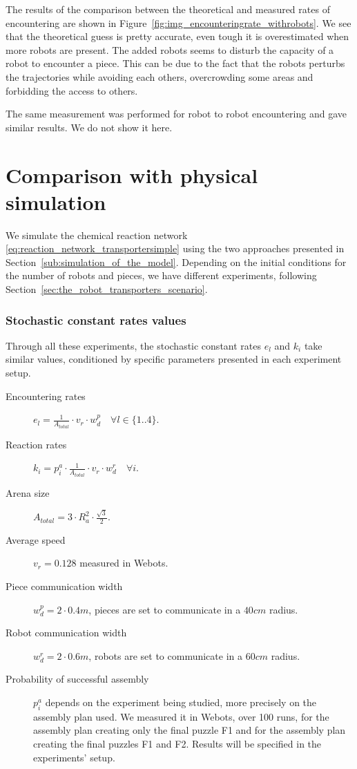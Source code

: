 		The results of the comparison between the theoretical and measured rates of encountering are shown in Figure~\ref{fig:img_encounteringrate_withrobots}. We see that the theoretical guess is pretty accurate, even tough it is overestimated when more robots are present. The added robots seems to disturb the capacity of a robot to encounter a piece. This can be due to the fact that the robots perturbs the trajectories while avoiding each others, overcrowding some areas and forbidding the access to others.
		
		The same measurement was performed for robot to robot encountering and gave similar results. We do not show it here.
		

\section{Comparison with physical simulation} %
\label{sec:comparison_with_physical_simulation}
	
	We simulate the chemical reaction network \eqref{eq:reaction_network_transportersimple} using the two approaches presented in Section~\ref{sub:simulation_of_the_model}. Depending on the initial conditions for the number of robots and pieces, we have different experiments, following Section~\ref{sec:the_robot_transporters_scenario}.
	
	\subsubsection{Stochastic constant rates values} %
	\label{ssub:stochastic_constant_rates_values}
		Through all these experiments, the stochastic constant rates $e_l$ and $k_i$ take similar values, conditioned by specific parameters presented in each experiment setup.
		
		\begin{description}
			\item[Encountering rates] $e_l = \frac{1}{A_{total}}\cdot v_r \cdot w_d^p \quad \forall l \in \{1..4\}$.
			\item[Reaction rates] $k_i = p^a_i\cdot \frac{1}{A_{total}}\cdot v_r \cdot w_d^r \quad \forall i$.
			\item[Arena size] $A_{total}=3 \cdot R_a^2 \cdot \frac{\sqrt{3}}{2}$.
			\item[Average speed] $v_r = 0.128$ measured in Webots.
			\item[Piece communication width] $w_d^p = 2\cdot0.4m$, pieces are set to communicate in a $40cm$ radius.
			\item[Robot communication width] $w_d^r = 2\cdot0.6m$, robots are set to communicate in a $60cm$ radius.
			\item[Probability of successful assembly] $p^a_i$ depends on the experiment being studied, more precisely on the assembly plan used. We measured it in Webots, over 100 runs, for the assembly plan creating only the final puzzle F1 and for the assembly plan creating the final puzzles F1 and F2. Results will be specified in the experiments' setup.
		\end{description}
	
